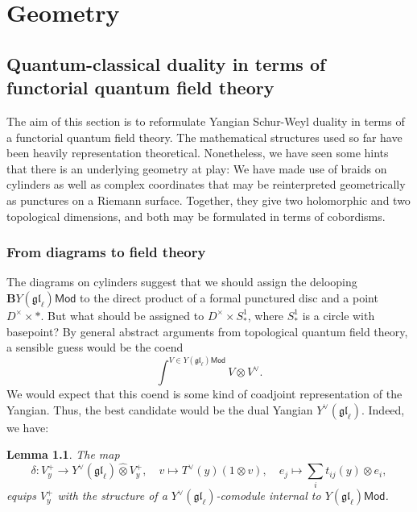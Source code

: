 \documentclass[11pt]{report}
\newtheorem{lemma}[theorem]{Lemma}
\theoremstyle{definition}
\theoremstyle{remark}
\theoremstyle{remark}
\begin{document}
\chapter{Geometry}\label{chapter:geometry}

\section{Quantum-classical duality in terms of functorial quantum field theory}

The aim of this section is to reformulate Yangian Schur-Weyl duality in terms of a functorial quantum field theory. The mathematical structures used so far have been heavily representation theoretical. Nonetheless, we have seen some hints that there is an underlying geometry at play: We have made use of braids on cylinders as well as complex coordinates that may be reinterpreted geometrically as punctures on a Riemann surface. Together, they give two holomorphic and two topological dimensions, and both may be formulated in terms of cobordisms.

\subsection{From diagrams to field theory}

The diagrams on cylinders suggest that we should assign the delooping $\mathbf{B}Y(\mathfrak{gl}_\ell)\mathsf{Mod}$ to the direct product of a formal punctured disc and a point $D^\times \times *$. But what should be assigned to $D^\times \times S_*^1$, where $S_*^1$ is a circle with basepoint? By general abstract arguments from topological quantum field theory, a sensible guess would be the coend
\begin{equation*}
\int^{V \in Y(\mathfrak{gl}_\ell)\mathsf{Mod}} V \otimes V^\vee.
\end{equation*}
We would expect that this coend is some kind of coadjoint representation of the Yangian. Thus, the best candidate would be the dual Yangian $Y^\vee(\mathfrak{gl}_\ell)$. Indeed, we have:

\begin{lemma}
The map
\begin{equation*}
\delta: V_y^+ \to Y^\vee(\mathfrak{gl}_\ell) \operatorname{\widehat{\otimes}} V_y^+, \quad v \mapsto T^\vee(y) (1 \otimes v), \quad e_j \mapsto \sum_i t_{ij}(y) \otimes e_i,
\end{equation*}
equips $V_y^+$ with the structure of a $Y^\vee(\mathfrak{gl}_\ell)$-comodule internal to $Y(\mathfrak{gl}_\ell)\mathsf{Mod}$.
\end{lemma}
\end{document}
